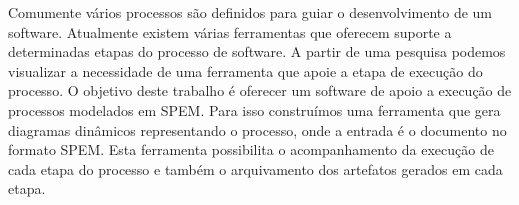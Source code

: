 \begin{resumo}%
 
Comumente vários processos são definidos para guiar o desenvolvimento de um software. Atualmente existem várias ferramentas que oferecem suporte a determinadas etapas do processo de software. A partir de uma pesquisa podemos visualizar a necessidade de uma ferramenta que apoie a etapa de execução do processo. O objetivo deste trabalho é oferecer um software de apoio a execução de processos modelados em SPEM. Para isso construímos uma ferramenta que gera diagramas dinâmicos representando o processo, onde a entrada é o documento no formato SPEM. Esta ferramenta possibilita o acompanhamento da execução de cada etapa do processo e também o arquivamento dos artefatos gerados em cada etapa.
 

\end{resumo}
